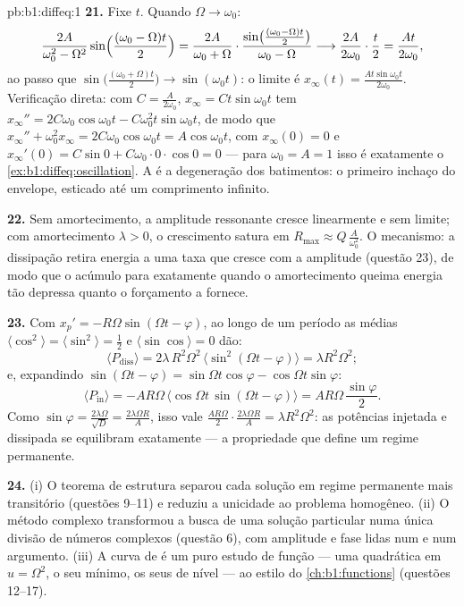 \begin{solution}{pb:b1:diffeq:1}
\textbf{21.} Fixe $t$. Quando $\Omega \to \omega_0$:
\[
\frac{2A}{\omega_0^2 - \Omega^2}\sin\Bigl(\frac{(\omega_0 -
\Omega)t}2\Bigr)
= \frac{2A}{\omega_0 + \Omega}\cdot
\frac{\sin\bigl(\frac{(\omega_0 - \Omega)t}2\bigr)}
{\omega_0 - \Omega}
\longrightarrow \frac{2A}{2\omega_0}\cdot\frac t2
= \frac{At}{2\omega_0} ,
\]
ao passo que $\sin\bigl(\frac{(\omega_0 + \Omega)t}2\bigr) \to
\sin(\omega_0 t)$: o limite é $x_\infty(t) =
\frac{At\sin\omega_0 t}{2\omega_0}$. Verificação direta: com $C =
\frac A{2\omega_0}$, $x_\infty = Ct\sin\omega_0 t$ tem
$x_\infty'' = 2C\omega_0\cos\omega_0 t - C\omega_0^2 t
\sin\omega_0 t$, de modo que $x_\infty'' + \omega_0^2 x_\infty =
2C\omega_0\cos\omega_0 t = A\cos\omega_0 t$, com $x_\infty(0) =
0$ e $x_\infty'(0) = C\sin 0 + C\omega_0 \cdot 0 \cdot \cos 0 =
0$ --- para $\omega_0 = A = 1$ isso é
exatamente o \cref{ex:b1:diffeq:oscillation}. A  é a
degeneração dos batimentos: o primeiro inchaço do envelope, esticado
até um comprimento infinito.

\textbf{22.} Sem amortecimento, a amplitude ressonante cresce
linearmente e sem limite; com amortecimento $\lambda > 0$, o crescimento
satura em $R_{\max} \approx Q\,\frac A{\omega_0^2}$. O mecanismo: a
dissipação retira energia a uma taxa que cresce com a amplitude
(questão 23), de modo que o acúmulo para exatamente quando o
amortecimento queima energia tão depressa quanto o forçamento a fornece.

\textbf{23.} Com $x_p' = -R\Omega\sin(\Omega t - \varphi)$, ao longo
de um período as médias $\langle\cos^2\rangle =
\langle\sin^2\rangle = \frac12$ e $\langle\sin\cos\rangle = 0$
dão:
\[
\langle P_{\mathrm{diss}}\rangle
= 2\lambda\,R^2\Omega^2\,\langle\sin^2(\Omega t -
\varphi)\rangle = \lambda R^2\Omega^2 ;
\]
e, expandindo $\sin(\Omega t - \varphi) = \sin\Omega t\cos\varphi
- \cos\Omega t\sin\varphi$:
\[
\langle P_{\mathrm{in}}\rangle
= -AR\Omega\,\bigl\langle\cos\Omega t\,\sin(\Omega t -
\varphi)\bigr\rangle
= AR\Omega\,\frac{\sin\varphi}2 .
\]
Como $\sin\varphi = \frac{2\lambda\Omega}{\sqrt D} =
\frac{2\lambda\Omega R}A$, isso vale $\frac{AR\Omega}2 \cdot
\frac{2\lambda\Omega R}A = \lambda R^2\Omega^2$: as potências injetada e
dissipada se equilibram exatamente --- a propriedade que define um
regime permanente.

\textbf{24.} (i) O teorema de estrutura separou cada solução em
regime permanente mais transitório (questões 9--11) e reduziu a
unicidade ao problema homogêneo. (ii) O método complexo
transformou a busca de uma solução particular numa única divisão de
números complexos (questão 6), com amplitude e fase lidas num
 e num argumento. (iii) A curva de  é um puro
estudo de função --- uma quadrática em $u = \Omega^2$, o seu mínimo,
os seus  de nível --- ao estilo do \cref{ch:b1:functions}
(questões 12--17).


\end{solution}
